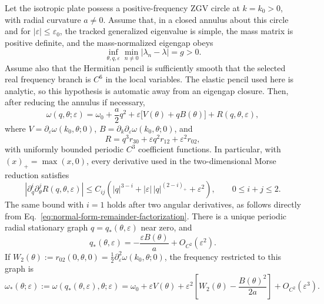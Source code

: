 \begin{theorem}
\label{thm:anisotropic-normal-form}
Let the isotropic plate possess a positive-frequency ZGV circle at
\(k=k_0>0\), with radial curvature \(a\ne0\).  Assume that, in a closed
annulus about this circle and for \(|\varepsilon|\leq\varepsilon_0\), the
tracked generalized eigenvalue is simple, the mass matrix is positive
definite, and the mass-normalized eigengap obeys
\begin{equation}
  \inf_{\theta,q,\varepsilon}
  \min_{n\ne0}|\lambda_n-\lambda|=g>0.
  \label{eq:uniform-anisotropic-eigengap}
\end{equation}
Assume also that the Hermitian pencil is sufficiently smooth that the
selected real frequency branch is \(C^6\) in the local variables.  The
elastic pencil used here is analytic, so this hypothesis is automatic away
from an eigengap closure.  Then,
after reducing the annulus if necessary,
\begin{equation}
  \omega(q,\theta;\varepsilon)
  =\omega_0+\frac{a}{2}q^2
   +\varepsilon\bigl[V(\theta)+qB(\theta)\bigr]
   +R(q,\theta,\varepsilon),
  \label{eq:controlled-anisotropic-normal-form}
\end{equation}
where \(V=\partial_\varepsilon\omega(k_0,\theta;0)\),
\(B=\partial_k\partial_\varepsilon\omega(k_0,\theta;0)\), and
\begin{equation}
  R=q^3r_{30}+\varepsilon q^2r_{12}+\varepsilon^2r_{02},
  \label{eq:normal-form-remainder-factorization}
\end{equation}
with uniformly bounded periodic \(C^3\) coefficient functions.  In
particular, with \((x)_+=\max(x,0)\), every derivative used
in the two-dimensional Morse reduction satisfies
\begin{equation}
  \left|
    \partial_q^i\partial_\theta^jR(q,\theta,\varepsilon)
  \right|
  \leq C_{ij}\left(
    |q|^{3-i}
    +|\varepsilon|\,|q|^{(2-i)_+}
    +\varepsilon^2
  \right),
  \qquad 0\leq i+j\leq2.
  \label{eq:derivative-level-c2-remainder}
\end{equation}
The same bound with \(i=1\) holds after two angular derivatives, as follows
directly from Eq.~\eqref{eq:normal-form-remainder-factorization}.  There is a
unique periodic radial stationary graph
\(q=q_*(\theta,\varepsilon)\) near zero, and
\begin{equation}
  q_*(\theta,\varepsilon)
  =-\frac{\varepsilon B(\theta)}{a}
   +O_{C^2}(\varepsilon^2).
  \label{eq:radial-shift}
\end{equation}
If
\(
  W_2(\theta):=r_{02}(0,\theta,0)
  =\tfrac12\partial_\varepsilon^2
    \omega(k_0,\theta;0)
\), the frequency restricted to this graph is
\begin{equation}
  \omega_*(\theta;\varepsilon)
  :=\omega(q_*(\theta,\varepsilon),\theta;\varepsilon)
  =\omega_0+\varepsilon V(\theta)
   +\varepsilon^2\left[
      W_2(\theta)-\frac{B(\theta)^2}{2a}
    \right]
   +O_{C^2}(\varepsilon^3).
  \label{eq:reduced-angular-frequency-second-order}
\end{equation}
\end{theorem}

